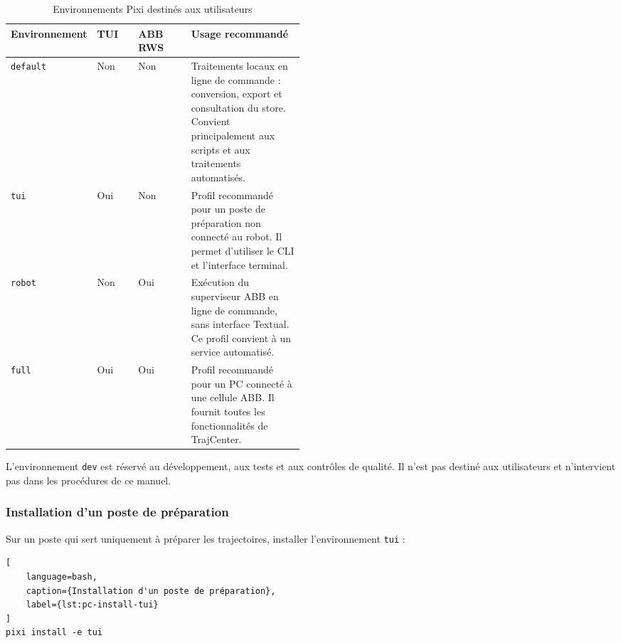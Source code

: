 \documentclass{rapportENSAM}
\begin{document}
\begin{table}[ht]
    \centering
    \small
    \begin{tabularx}{\linewidth}{
        |p{0.16\linewidth}
        |p{0.14\linewidth}
        |p{0.18\linewidth}
        |X|
    }
        \hline
        \textbf{Environnement} &
        \textbf{TUI} &
        \textbf{ABB RWS} &
        \textbf{Usage recommandé} \\
        \hline

        \texttt{default} &
        Non &
        Non &
        Traitements locaux en ligne de commande : conversion, export et
        consultation du store. Convient principalement aux scripts et aux
        traitements automatisés. \\
        \hline

        \texttt{tui} &
        Oui &
        Non &
        Profil recommandé pour un poste de préparation non connecté au
        robot. Il permet d'utiliser le CLI et l'interface terminal. \\
        \hline

        \texttt{robot} &
        Non &
        Oui &
        Exécution du superviseur ABB en ligne de commande, sans interface
        Textual. Ce profil convient à un service automatisé. \\
        \hline

        \texttt{full} &
        Oui &
        Oui &
        Profil recommandé pour un PC connecté à une cellule ABB. Il fournit
        toutes les fonctionnalités de TrajCenter. \\
        \hline
    \end{tabularx}
    \caption{Environnements Pixi destinés aux utilisateurs}
    \label{tab:pc-pixi-environments}
\end{table}

L'environnement \texttt{dev} est réservé au développement, aux tests et aux
contrôles de qualité. Il n'est pas destiné aux utilisateurs et n'intervient
pas dans les procédures de ce manuel.


\subsubsection{Installation d'un poste de préparation}
\label{subsubsec:pc-tui-installation}

Sur un poste qui sert uniquement à préparer les trajectoires, installer
l'environnement \texttt{tui} :

\begin{lstlisting}[
    language=bash,
    caption={Installation d'un poste de préparation},
    label={lst:pc-install-tui}
]
pixi install -e tui
\end{lstlisting}
\end{document}
